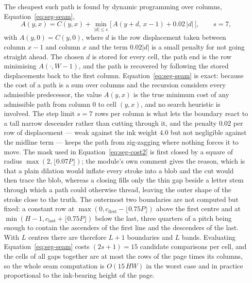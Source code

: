 The cheapest such path is found by dynamic programming over columns, Equation~\ref{eq:seg-seam},
\begin{equation}
A(y,x)=C(y,x)+\min_{|d|\le s}\bigl[\,A(y+d,\,x-1)+0.02\,|d|\,\bigr],\qquad s=7,
\label{eq:seg-seam}
\end{equation}
with $A(y,0)=C(y,0)$, where $d$ is the row displacement taken between column $x-1$ and column $x$ and the term $0.02|d|$ is a small penalty for not going straight ahead.
The chosen $d$ is stored for every cell, the path end is the row minimising $A(\cdot,W-1)$, and the path is recovered by following the stored displacements back to the first column.
Equation~\ref{eq:seg-seam} is exact: because the cost of a path is a sum over columns and the recursion considers every admissible predecessor, the value $A(y,x)$ is the true minimum cost of any admissible path from column 0 to cell $(y,x)$, and no search heuristic is involved.
The step limit $s=7$ rows per column is what lets the boundary react to a tall narrow descender rather than cutting through it, and the penalty $0.02$ per row of displacement --- weak against the ink weight $4.0$ but not negligible against the midline term --- keeps the path from zig-zagging where nothing forces it to move.
The mask used in Equation~\ref{eq:seg-cost2} is first closed by a square of radius $\max(2,\lfloor0.07P\rfloor)$; the module's own comment gives the reason, which is that a plain dilation would inflate every stroke into a blob and the cut would then trace the blob, whereas a closing fills only the thin gap beside a letter stem through which a path could otherwise thread, leaving the outer shape of the stroke close to the truth.
The outermost two boundaries are not computed but fixed: a constant row at $\max(0,c_{\mathrm{first}}-\lfloor0.75P\rfloor)$ above the first centre and at $\min(H-1,c_{\mathrm{last}}+\lfloor0.75P\rfloor)$ below the last, three quarters of a pitch being enough to contain the ascenders of the first line and the descenders of the last.
With $L$ centres there are therefore $L+1$ boundaries and $L$ bands.
Evaluating Equation~\ref{eq:seg-seam} costs $(2s+1)=15$ candidate comparisons per cell, and the cells of all gaps together are at most the rows of the page times its columns, so the whole seam computation is $O(15\,HW)$ in the worst case and in practice proportional to the ink-bearing height of the page.

